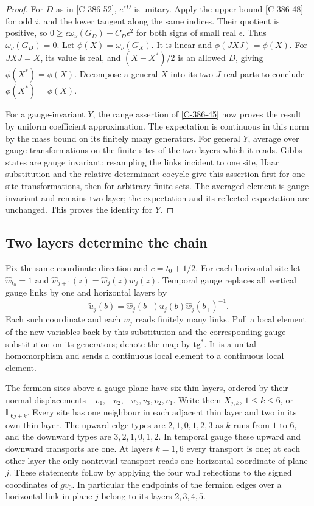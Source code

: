 \documentclass[11pt,letterpaper,reqno]{amsart}
\theoremstyle{definition}
\theoremstyle{remark}
\begin{document}
\begin{proof}
For $D$ as in \cref{C-386-52}, $e^{\epsilon D}$ is unitary.
Apply the upper bound \cref{C-386-48} for odd $i$, and the
lower tangent along the same indices. Their quotient is positive,
so
$0\ge\epsilon\omega_\nu(G_D)-C_D\epsilon^2$ for both signs
of small real $\epsilon$. Thus $\omega_\nu(G_D)=0$.
Let $\phi(X)=\omega_\nu(G_X)$. It is linear and
$\phi(JXJ)=\overline{\phi(X)}$. For $JXJ=X$, its value is
real, and $(X-X^*)/2$ is an allowed $D$, giving
$\phi(X^*)=\phi(X)$. Decompose a general $X$ into its two
$J$-real parts to conclude
$\phi(X^*)=\overline{\phi(X)}$.

For a gauge-invariant $Y$, the range assertion of
\cref{C-386-45} now proves the result by uniform coefficient
approximation. The expectation is continuous in this norm by the
mass bound on its finitely many generators. For general $Y$,
average over gauge transformations on the finite sites of the
two layers which it reads. Gibbs states are gauge invariant:
resampling the links incident to one site, Haar substitution and
the relative-determinant cocycle give this assertion first for
one-site transformations, then for arbitrary finite sets.
The averaged element is gauge invariant and remains two-layer;
the expectation and its reflected expectation are unchanged.
This proves the identity for $Y$.
\end{proof}

\subsection{Two layers determine the chain}

Fix the same coordinate direction and $c=t_0+1/2$. For each
horizontal site let $\widehat w_{t_0}=1$ and
$\widehat w_{j+1}(z)=\widehat w_j(z)w_j(z)$.
Temporal gauge replaces all vertical gauge links by one and
horizontal layers by
\[
 \widetilde u_j(b)=\widehat w_j(b_-)u_j(b)\widehat w_j(b_+)^{-1}.
\]
Each such coordinate and each $\widehat w_j$ reads finitely many
links. Pull a local element of the new variables back by this
substitution and the corresponding gauge substitution on its
generators; denote the map by $\mathrm{tg}^*$.
It is a unital homomorphism and sends a continuous local element
to a continuous local element.

The fermion sites above a gauge plane have six thin layers,
ordered by their normal displacements
$-v_1,-v_2,-v_3,v_3,v_2,v_1$. Write them $X_{j,k}$,
$1\le k\le6$, or $\mathbb L_{6j+k}$. Every site has one
neighbour in each adjacent thin layer and two in its own thin
layer. The upward edge types are $2,1,0,1,2,3$ as $k$ runs
from $1$ to $6$, and the downward types are $3,2,1,0,1,2$.
In temporal gauge these upward and downward transports are one.
At layers $k=1,6$ every transport is one; at each other layer
the only nontrivial transport reads one horizontal coordinate
of plane $j$. These statements follow by applying the four
wall reflections to the signed coordinates of $gv_0$.
In particular the endpoints of the fermion edges over a
horizontal link in plane $j$ belong to its layers $2,3,4,5$.
\end{document}
